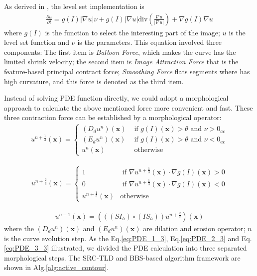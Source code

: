 As derived in \cite{Marquez-Neila2014}, the level set implementation is 
\begin{align}
	\frac{\partial u}{\partial t} = g(I)|\nabla u|\nu +g(I) |\nabla u|\text{div}(\frac{\nabla u}{|\nabla u|}) + \nabla g(I) \nabla u
\end{align}
where $g(I)$ is the function to select the interesting part of the image; $u$ is the level set function and $\nu$ is the parameters. This equation involved three components: The first item is \textit{Balloon Force}, which makes the curve has the limited shrink velocity; the second item is \textit{Image Attraction Force} that is the feature-based principal contract force; \textit{Smoothing Force} flats segments where has high curvature, and this force is denoted as the third item.

Instead of solving PDE function directly, we could adopt a morphological approach to calculate the above mentioned force more convenient and fast. These three contraction force can be established by a morphological operator:
\begin{align}
	\label{eq:PDE_1_3}
	u^{n+\frac{1}{3}}(\mathbf{x})=\left\{ \begin{array}{ll}
		(D_du^n)(\mathbf{x}) &\mbox{ if $g(I)(\mathbf{x})>\theta$ and $\nu>0_{ac}$} \\
		(E_du^n)(\mathbf{x}) &\mbox{ if $g(I)(\mathbf{x})>\theta$ and $\nu<0_{ac}$} \\
		u^{n}(\mathbf{x}) &\mbox{ otherwise}
	\end{array} \right.
\end{align}

\begin{align}
	\label{eq:PDE_2_3}
	u^{n+\frac{2}{3}}(\mathbf{x})=\left\{ \begin{array}{ll}
		1 &\mbox{ if $\nabla u^{n+\frac{1}{3}}(\mathbf{x}) \cdot \nabla g(I)(\mathbf{x}) > 0$} \\
		0&\mbox{ if $\nabla u^{n+\frac{1}{3}}(\mathbf{x}) \cdot \nabla g(I)(\mathbf{x}) < 0$} \\
		u^{n+\frac{1}{3}}(\mathbf{x}) &\mbox{otherwise}
	\end{array} \right.
\end{align}

\begin{align}
	\label{eq:PDE_3_3}
	u^{n+1} (\mathbf{x}) = (((SI_h) \circ (IS_h)) u^{n+\frac{2}{3}})(\mathbf{x})
\end{align}
where the $(D_du^n)(\mathbf{x})$ and $(E_du^n)(\mathbf{x})$ are dilation and erosion operator; $n$ is the curve evolution step. As the Eq.\ref{eq:PDE_1_3}, Eq.\ref{eq:PDE_2_3} and Eq.\ref{eq:PDE_3_3} illustrated, we divided the PDE calculation into three separated morphological steps. The SRC-TLD and BBS-based algorithm framework are shown in Alg.\ref{alg:active_contour}.


